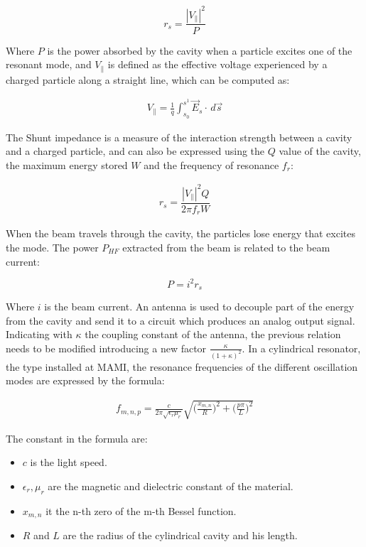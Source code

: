 \begin{equation}
r_{s} = \frac{|V_{\|}|^{2}}{P}
\end{equation}

Where $P$ is the power absorbed by the cavity when a particle excites one of the resonant mode, and $V_{\|}$ is defined as the effective voltage experienced by a charged particle along a straight line, which can be computed as:

\begin{align*}
V_{\|} = \frac{1}{q}  \int_{s_{0}}^{s^{1}} \vec{E}_{s} \cdot  \,d \vec{s}
\end{align*}

The Shunt impedance is a measure of the interaction strength between a cavity and a charged particle, and can also be expressed using the $Q$ value of the cavity, the maximum energy stored $W$ and the frequency of resonance $f_{r}$:

\begin{align*}
r_{s} = \dfrac{|V_{\|}|^{2} Q}{2 \pi f_{r} W}
\end{align*}

When the beam travels through the cavity, the particles lose energy that excites the mode. The power $P_{HF}$ extracted from the beam is related to the beam current: 

\begin{equation}
P = i^{2} r_{s}
\end{equation}

Where $i$ is the beam current. An antenna is used to decouple part of the energy from the cavity and send it to a circuit which produces an analog output signal. Indicating with $\kappa$ the coupling constant of the antenna, the previous relation needs to be modified introducing a new factor $ \frac{\kappa}{(1 + \kappa)^2}$. In a cylindrical resonator, the type installed at MAMI, the resonance frequencies of the different oscillation modes are expressed by the formula: 

\begin{align*}
f_{m,n,p} = \frac{c}{2\pi \sqrt{\epsilon_{r} \mu_{r}}} \sqrt{\bigl(\frac{x_{m,n}}{R} \bigl)^{2} + \bigl(\frac{p \pi}{L} \bigl)^{2}}
\end{align*}

The constant in the formula are:

\begin{itemize}
\item $c$ is the light speed.
\item $\epsilon_{r}, \mu_{r}$ are the magnetic and dielectric constant of the material.
\item $x_{m,n}$ it the n-th zero of the m-th Bessel function.
\item $R$ and $L$ are the radius of the cylindrical cavity and his length.
\end{itemize}

